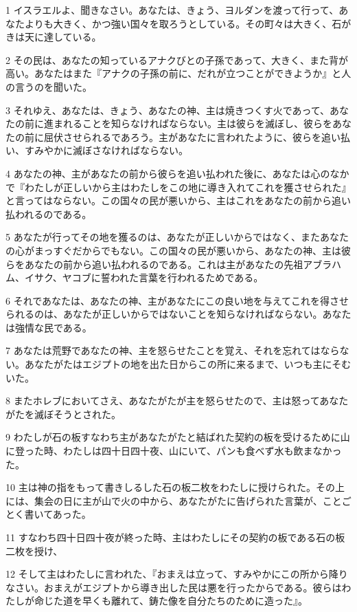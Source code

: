 \par 1 イスラエルよ、聞きなさい。あなたは、きょう、ヨルダンを渡って行って、あなたよりも大きく、かつ強い国々を取ろうとしている。その町々は大きく、石がきは天に達している。
\par 2 その民は、あなたの知っているアナクびとの子孫であって、大きく、また背が高い。あなたはまた『アナクの子孫の前に、だれが立つことができようか』と人の言うのを聞いた。
\par 3 それゆえ、あなたは、きょう、あなたの神、主は焼きつくす火であって、あなたの前に進まれることを知らなければならない。主は彼らを滅ぼし、彼らをあなたの前に屈伏させられるであろう。主があなたに言われたように、彼らを追い払い、すみやかに滅ぼさなければならない。
\par 4 あなたの神、主があなたの前から彼らを追い払われた後に、あなたは心のなかで『わたしが正しいから主はわたしをこの地に導き入れてこれを獲させられた』と言ってはならない。この国々の民が悪いから、主はこれをあなたの前から追い払われるのである。
\par 5 あなたが行ってその地を獲るのは、あなたが正しいからではなく、またあなたの心がまっすぐだからでもない。この国々の民が悪いから、あなたの神、主は彼らをあなたの前から追い払われるのである。これは主があなたの先祖アブラハム、イサク、ヤコブに誓われた言葉を行われるためである。
\par 6 それであなたは、あなたの神、主があなたにこの良い地を与えてこれを得させられるのは、あなたが正しいからではないことを知らなければならない。あなたは強情な民である。
\par 7 あなたは荒野であなたの神、主を怒らせたことを覚え、それを忘れてはならない。あなたがたはエジプトの地を出た日からこの所に来るまで、いつも主にそむいた。
\par 8 またホレブにおいてさえ、あなたがたが主を怒らせたので、主は怒ってあなたがたを滅ぼそうとされた。
\par 9 わたしが石の板すなわち主があなたがたと結ばれた契約の板を受けるために山に登った時、わたしは四十日四十夜、山にいて、パンも食べず水も飲まなかった。
\par 10 主は神の指をもって書きしるした石の板二枚をわたしに授けられた。その上には、集会の日に主が山で火の中から、あなたがたに告げられた言葉が、ことごとく書いてあった。
\par 11 すなわち四十日四十夜が終った時、主はわたしにその契約の板である石の板二枚を授け、
\par 12 そして主はわたしに言われた、『おまえは立って、すみやかにこの所から降りなさい。おまえがエジプトから導き出した民は悪を行ったからである。彼らはわたしが命じた道を早くも離れて、鋳た像を自分たちのために造った』。
